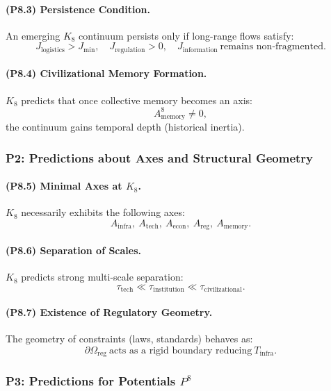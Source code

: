 \paragraph{(P8.3) Persistence Condition.}
An emerging $K_8$ continuum persists only if long-range flows satisfy:
\[
J_{\mathrm{logistics}} > J_{\mathrm{min}},
\quad  
J_{\mathrm{regulation}} > 0,
\quad
J_{\mathrm{information}} \ \text{remains non-fragmented}.
\]

\paragraph{(P8.4) Civilizational Memory Formation.}
$K_8$ predicts that once collective memory becomes an axis:
\[
A_{\mathrm{memory}}^8 \neq 0,
\]
the continuum gains temporal depth (historical inertia).

\subsubsection{P2: Predictions about Axes and Structural Geometry}

\paragraph{(P8.5) Minimal Axes at \texorpdfstring{$K_8$}{K_8}.}
$K_8$ necessarily exhibits the following axes:
\[
A_{\mathrm{infra}},\ 
A_{\mathrm{tech}},\ 
A_{\mathrm{econ}},\ 
A_{\mathrm{reg}},\ 
A_{\mathrm{memory}}.
\]

\paragraph{(P8.6) Separation of Scales.}
$K_8$ predicts strong multi-scale separation:
\[
\tau_{\mathrm{tech}} \ll \tau_{\mathrm{institution}} \ll \tau_{\mathrm{civilizational}}.
\]

\paragraph{(P8.7) Existence of Regulatory Geometry.}
The geometry of constraints (laws, standards) behaves as:
\[
\partial\Omega_{\mathrm{reg}} 
\ \text{acts as a rigid boundary reducing} \ 
T_{\mathrm{infra}}.
\]

\subsubsection{P3: Predictions for Potentials $P^{8}$}

